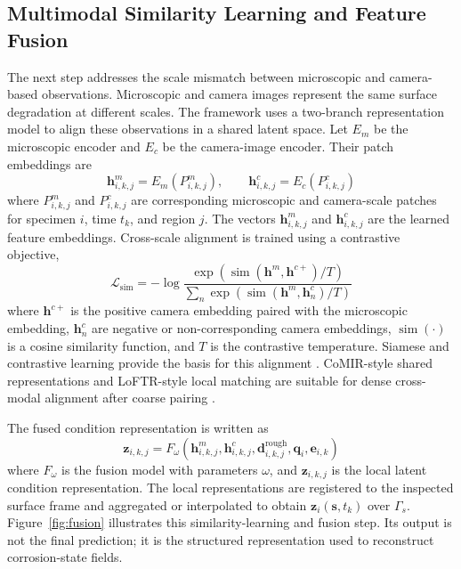\documentclass[colorlinks,upint,subscriptcorrection,varvw,hyphenate,balance]{asmeconf}
\newcommand{\vect}[1]{\bm{#1}}
\newcommand{\loss}{\mathcal{L}}
\newcommand{\surf}{\Gamma_s}
\begin{document}
\subsection{Multimodal Similarity Learning and Feature Fusion}
The next step addresses the scale mismatch between microscopic and camera-based observations. Microscopic and camera images represent the same surface degradation at different scales. The framework uses a two-branch representation model to align these observations in a shared latent space. Let $E_m$ be the microscopic encoder and $E_c$ be the camera-image encoder. Their patch embeddings are
\begin{equation}
\vect{h}^{m}_{i,k,j}=E_m(P^{m}_{i,k,j}),\qquad
\vect{h}^{c}_{i,k,j}=E_c(P^{c}_{i,k,j})
\label{eq:embeddings}
\end{equation}
where $P^{m}_{i,k,j}$ and $P^{c}_{i,k,j}$ are corresponding microscopic and camera-scale patches for specimen $i$, time $t_k$, and region $j$. The vectors $\vect{h}^{m}_{i,k,j}$ and $\vect{h}^{c}_{i,k,j}$ are the learned feature embeddings.
Cross-scale alignment is trained using a contrastive objective,
\begin{equation}
\loss_{\mathrm{sim}}=-\log\frac{\exp\left(\operatorname{sim}(\vect{h}^{m},\vect{h}^{c+})/T\right)}{\sum_{n}\exp\left(\operatorname{sim}(\vect{h}^{m},\vect{h}^{c}_{n})/T\right)}
\label{eq:simloss}
\end{equation}
where $\vect{h}^{c+}$ is the positive camera embedding paired with the microscopic embedding, $\vect{h}^{c}_{n}$ are negative or non-corresponding camera embeddings, $\operatorname{sim}(\cdot)$ is a cosine similarity function, and $T$ is the contrastive temperature. Siamese and contrastive learning provide the basis for this alignment \cite{bromley1993siamese,chen2020simclr}.
CoMIR-style shared representations and LoFTR-style local matching are suitable for dense cross-modal alignment after coarse pairing \cite{pielawski2020comir,sun2021loftr}.

The fused condition representation is written as
\begin{equation}
\vect{z}_{i,k,j}=F_{\omega}\left(\vect{h}^{m}_{i,k,j},\vect{h}^{c}_{i,k,j},\vect{d}^{\mathrm{rough}}_{i,k,j},\vect{q}_{i},\vect{e}_{i,k}\right)
\label{eq:fusion}
\end{equation}
where $F_{\omega}$ is the fusion model with parameters $\omega$, and $\vect{z}_{i,k,j}$ is the local latent condition representation. The local representations are registered to the inspected surface frame and aggregated or interpolated to obtain $\vect{z}_{i}(\vect{s},t_k)$ over $\surf$. Figure~\ref{fig:fusion} illustrates this similarity-learning and fusion step. Its output is not the final prediction; it is the structured representation used to reconstruct corrosion-state fields.
\end{document}
